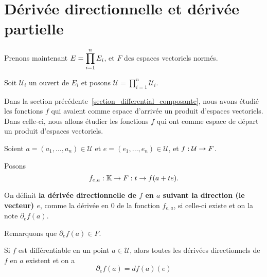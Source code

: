 \section{Dérivée directionnelle et dérivée partielle}
\label{section_directionnal_partial_derivative}

Prenons maintenant $E = \displaystyle \prod_{i = 1}^{n} E_{i}$, et $F$ des espaces vectoriels
normés.

Soit $\mathcal{U}_{i}$ un ouvert de $E_{i}$ et posons $\mathcal{U} =
\displaystyle \prod_{i = 1}^{n} \mathcal{U}_{i}$.

Dans la section précédente~\ref{section_differential_composante}, nous avons
étudié les fonctions $f$ qui avaient comme espace d'arrivée un produit d'espaces
vectoriels. Dans celle-ci, nous allons étudier les fonctions $f$ qui ont comme
espace de départ un produit d'espaces vectoriels.


\begin{definition}
\label{directionnal_application_definition}
	Soient $a = (a_{1}, \ldots, a_{n}) \in \mathcal{U}$ et $e = (e_{1}, \ldots,
	e_{n}) \in \mathcal{U}$,
	et $f : \mathcal{U} \rightarrow F$.

	Posons
	\begin{equation*}
		f_{e, a} : \mathbb{K} \rightarrow F: t \rightarrow f(a + te).
	\end{equation*}

	On définit \textbf{la dérivée directionnelle de $f$ en $a$ suivant la direction (le
	vecteur) $e$}, comme la dérivée en $0$ de la fonction $f_{e, a}$, si celle-ci
	existe et on la note ${\partial_{e} f}(a)$.

	Remarquons que $\partial_{e} f (a) \in F$.
\end{definition}

\begin{proposition}
	Si $f$ est différentiable en un point $a \in \mathcal{U}$, alors toutes les
	dérivées directionnels de $f$ en $a$ existent et on a
	\begin{equation*}
		\partial_{e}f(a) = df(a)(e)
	\end{equation*}
\end{proposition}

